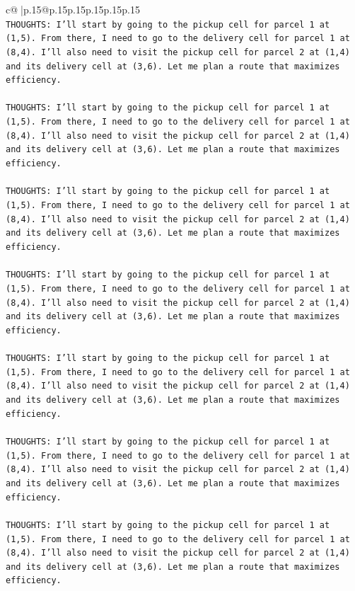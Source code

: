 \documentclass{article}
\begin{document}
{\begin{supertabular}{c@{$\;$}|p{.15\linewidth}@{}p{.15\linewidth}p{.15\linewidth}p{.15\linewidth}p{.15\linewidth}p{.15\linewidth}}
{{{\\ 
\texttt{THOUGHTS: I'll start by going to the pickup cell for parcel 1 at (1,5). From there, I need to go to the delivery cell for parcel 1 at (8,4). I'll also need to visit the pickup cell for parcel 2 at (1,4) and its delivery cell at (3,6). Let me plan a route that maximizes efficiency.} \\
\\ 
\texttt{THOUGHTS: I'll start by going to the pickup cell for parcel 1 at (1,5). From there, I need to go to the delivery cell for parcel 1 at (8,4). I'll also need to visit the pickup cell for parcel 2 at (1,4) and its delivery cell at (3,6). Let me plan a route that maximizes efficiency.} \\
\\ 
\texttt{THOUGHTS: I'll start by going to the pickup cell for parcel 1 at (1,5). From there, I need to go to the delivery cell for parcel 1 at (8,4). I'll also need to visit the pickup cell for parcel 2 at (1,4) and its delivery cell at (3,6). Let me plan a route that maximizes efficiency.} \\
\\ 
\texttt{THOUGHTS: I'll start by going to the pickup cell for parcel 1 at (1,5). From there, I need to go to the delivery cell for parcel 1 at (8,4). I'll also need to visit the pickup cell for parcel 2 at (1,4) and its delivery cell at (3,6). Let me plan a route that maximizes efficiency.} \\
\\ 
\texttt{THOUGHTS: I'll start by going to the pickup cell for parcel 1 at (1,5). From there, I need to go to the delivery cell for parcel 1 at (8,4). I'll also need to visit the pickup cell for parcel 2 at (1,4) and its delivery cell at (3,6). Let me plan a route that maximizes efficiency.} \\
\\ 
\texttt{THOUGHTS: I'll start by going to the pickup cell for parcel 1 at (1,5). From there, I need to go to the delivery cell for parcel 1 at (8,4). I'll also need to visit the pickup cell for parcel 2 at (1,4) and its delivery cell at (3,6). Let me plan a route that maximizes efficiency.} \\
\\ 
\texttt{THOUGHTS: I'll start by going to the pickup cell for parcel 1 at (1,5). From there, I need to go to the delivery cell for parcel 1 at (8,4). I'll also need to visit the pickup cell for parcel 2 at (1,4) and its delivery cell at (3,6). Let me plan a route that maximizes efficiency.} \\
}}}
\end{supertabular}}
\end{document}
